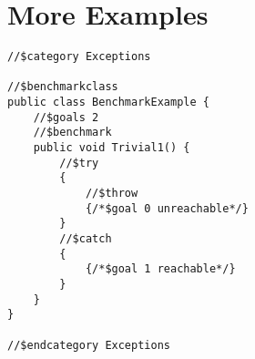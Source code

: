 \label{MoreExamples}\section{More Examples}

\begin{verbatim}
//$category Exceptions

//$benchmarkclass
public class BenchmarkExample {
    //$goals 2
    //$benchmark
    public void Trivial1() {
        //$try
        {
            //$throw
            {/*$goal 0 unreachable*/}        
        }
        //$catch
        {
            {/*$goal 1 reachable*/}        
        }
    }
}

//$endcategory Exceptions
\end{verbatim}
